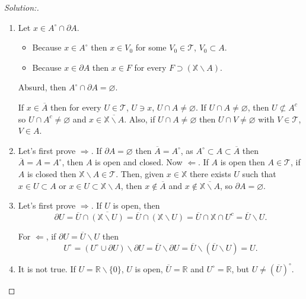 \documentclass[a4paper,12pt, reqno]{article}
\theoremstyle{definition}
\newenvironment{solution}{\begin{proof}[Solution:]}{\end{proof}}
\newcommand{\R}{\mathbb{R}}
\newcommand{\T}{\mathscr{T}}
\newcommand{\X}{\mathbb{X}}
\begin{document}
\begin{solution}\hfill
  \begin{enumerate}[label=(\alph*)]
    \item Let $x\in A^\circ\cap \partial A$.
          \begin{itemize}
            \item Because $x\in A^\circ$ then $x\in V_{0}$ for some $V_{0}\in\T$, $V_{0}\subset A$.
            \item Because $x\in\partial A$ then $x\in F$ for every $F\supset(\X\backslash A)$.
          \end{itemize}
          Absurd, then $A^\circ\cap\partial A = \varnothing$.

          If $x\in \overline{A}$ then for every $U\in\T$, $U\ni x$, $U\cap A\neq \varnothing$. If $U\cap A\neq \varnothing$, then $U\not\subset A^c$ so $U\cap A^c\neq \varnothing$ and $x\in\overline{\X\backslash A}$. Also, if $U\cap A\neq \varnothing$ then $U\cap V\neq \varnothing$ with $V\in\T$, $V\in A$.

    \item Let's first prove $\Longrightarrow$. If $\partial A = \varnothing$ then $\overline{A} = A^\circ$, as $A^\circ \subset A\subset \overline{A}$ then $\overline{A} = A = A^\circ$, then $A$ is open and closed.
          Now $\Longleftarrow$. If $A$ is open then $A\in\T$, if $A$ is closed then $\X\backslash A\in\T$. Then, given $x\in\X$ there exists $U$ such that $x\in U\subset A$ or $x\in U\subset\X\backslash A$, then $x\notin \overline{A}$ and $x\notin \overline{\X\backslash A}$, so $\partial A = \varnothing$.

    \item Let's first prove $\Longrightarrow$. If $U$ is open, then
          \begin{equation*}
            \partial U = \overline{U}\cap\overline{(\X\backslash U)} = \overline{U}\cap(\X\backslash U) = \overline{U} \cap\X\cap U^c = \overline{U}\backslash U.
          \end{equation*}

          For $\Longleftarrow$, if $\partial U = \overline{U}\backslash U$ then
          \begin{equation*}
            U^\circ = (U^\circ\cup \partial U) \backslash \partial U = \overline{U}\backslash \partial U = \overline{U}\backslash(\overline{U}\backslash U ) = U.
          \end{equation*}
    \item It is not true. If $U = \R\backslash\{ 0 \}$, $U$ is open, $\overline{U} = \R$ and $U^\circ = \R$, but $U\neq (\overline{U})^\circ$.
  \end{enumerate}
\end{solution}
\end{document}
